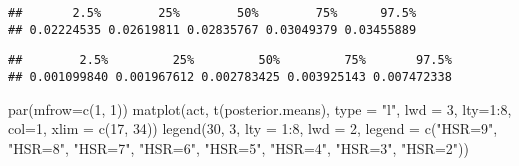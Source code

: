 \documentclass[
]{book}
\newenvironment{Shaded}{\begin{snugshade}}{\end{snugshade}}
\newcommand{\AttributeTok}[1]{\textcolor[rgb]{0.77,0.63,0.00}{#1}}
\newcommand{\DecValTok}[1]{\textcolor[rgb]{0.00,0.00,0.81}{#1}}
\newcommand{\FunctionTok}[1]{\textcolor[rgb]{0.00,0.00,0.00}{#1}}
\newcommand{\NormalTok}[1]{#1}
\newcommand{\OtherTok}[1]{\textcolor[rgb]{0.56,0.35,0.01}{#1}}
\newcommand{\SpecialCharTok}[1]{\textcolor[rgb]{0.00,0.00,0.00}{#1}}
\newcommand{\StringTok}[1]{\textcolor[rgb]{0.31,0.60,0.02}{#1}}
\begin{document}
\begin{verbatim}
##       2.5%        25%        50%        75%      97.5% 
## 0.02224535 0.02619811 0.02835767 0.03049379 0.03455889
\end{verbatim}

\begin{Shaded}
\end{Shaded}

\begin{verbatim}
##        2.5%         25%         50%         75%       97.5% 
## 0.001099840 0.001967612 0.002783425 0.003925143 0.007472338
\end{verbatim}

\begin{Shaded}
\end{Shaded}

\begin{Shaded}
\begin{Highlighting}[]
\FunctionTok{par}\NormalTok{(}\AttributeTok{mfrow=}\FunctionTok{c}\NormalTok{(}\DecValTok{1}\NormalTok{, }\DecValTok{1}\NormalTok{))}
\FunctionTok{matplot}\NormalTok{(act, }\FunctionTok{t}\NormalTok{(posterior.means), }
        \AttributeTok{type =} \StringTok{"l"}\NormalTok{, }\AttributeTok{lwd =} \DecValTok{3}\NormalTok{, }\AttributeTok{lty=}\DecValTok{1}\SpecialCharTok{:}\DecValTok{8}\NormalTok{, }\AttributeTok{col=}\DecValTok{1}\NormalTok{,}
        \AttributeTok{xlim =} \FunctionTok{c}\NormalTok{(}\DecValTok{17}\NormalTok{, }\DecValTok{34}\NormalTok{))}
\FunctionTok{legend}\NormalTok{(}\DecValTok{30}\NormalTok{, }\DecValTok{3}\NormalTok{, }\AttributeTok{lty =} \DecValTok{1}\SpecialCharTok{:}\DecValTok{8}\NormalTok{, }\AttributeTok{lwd =} \DecValTok{2}\NormalTok{, }
       \AttributeTok{legend =} \FunctionTok{c}\NormalTok{(}\StringTok{"HSR=9"}\NormalTok{, }\StringTok{"HSR=8"}\NormalTok{, }\StringTok{"HSR=7"}\NormalTok{,}
                  \StringTok{"HSR=6"}\NormalTok{, }\StringTok{"HSR=5"}\NormalTok{, }\StringTok{"HSR=4"}\NormalTok{,}
                  \StringTok{"HSR=3"}\NormalTok{, }\StringTok{"HSR=2"}\NormalTok{))}
\end{Highlighting}
\end{Shaded}
\end{document}
